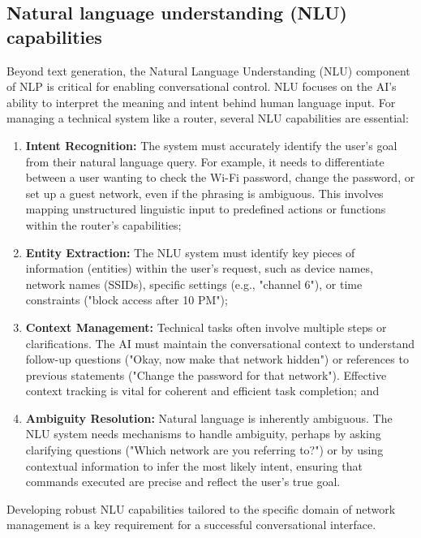 \subsection{Natural language understanding (NLU) capabilities}
Beyond text generation, the Natural Language Understanding (NLU) component of NLP is critical for enabling conversational control. NLU focuses on the AI's ability to interpret the meaning and intent behind human language input. For managing a technical system like a router, several NLU capabilities are essential:

\begin{enumerate}
\item \textbf{Intent Recognition:} The system must accurately identify the user's goal from their natural language query. For example, it needs to differentiate between a user wanting to check the Wi-Fi password, change the password, or set up a guest network, even if the phrasing is ambiguous. This involves mapping unstructured linguistic input to predefined actions or functions within the router's capabilities;

\item \textbf{Entity Extraction:} The NLU system must identify key pieces of information (entities) within the user's request, such as device names, network names (SSIDs), specific settings (e.g., "channel 6"), or time constraints ("block access after 10 PM");

\item \textbf{Context Management:} Technical tasks often involve multiple steps or clarifications. The AI must maintain the conversational context to understand follow-up questions ("Okay, now make that network hidden") or references to previous statements ("Change the password for that network"). Effective context tracking is vital for coherent and efficient task completion; and

\item \textbf{Ambiguity Resolution:} Natural language is inherently ambiguous. The NLU system needs mechanisms to handle ambiguity, perhaps by asking clarifying questions ("Which network are you referring to?") or by using contextual information to infer the most likely intent, ensuring that commands executed are precise and reflect the user's true goal.
\end{enumerate}

Developing robust NLU capabilities tailored to the specific domain of network management is a key requirement for a successful conversational interface.

